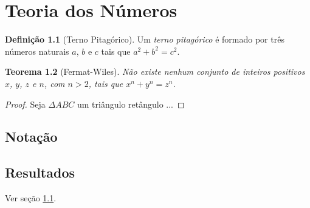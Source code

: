 \documentclass[]{book}
\author{Lucas Arantes Berg}
\theoremstyle{theorem}
\newtheorem{teo}{Teorema}[chapter]
\theoremstyle{definition}
\newtheorem{defi}[teo]{Definição}
\begin{document}
	
	\tableofcontents
	
	\chapter{Teoria dos Números} \label{cap:teoria}
	
		\begin{defi}[Terno Pitagórico]
			Um \emph{terno pitagórico} é formado por três números naturais $a$, $b$ e $c$ tais que $a^2 + b^2 = c^2$.
		\end{defi}
		
		\begin{teo}[Fermat-Wiles] \label{teo:teoFermat}
			Não existe nenhum conjunto de inteiros positivos $x$, $y$, $z$ e $n$, com $n > 2$, tais que $x^n + y^n = z^n$.
		\end{teo}
		
		\begin{proof}
			Seja $\Delta ABC$ um triângulo retângulo ...
		\end{proof}
		
		
	
	\section{Notação} \label{cap:notacao}
	
	\section{Resultados} \label{cap:resultados}
	
	Ver seção \ref{cap:notacao}.
		
\end{document}
